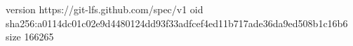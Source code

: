 version https://git-lfs.github.com/spec/v1
oid sha256:a0114dc01c02e9d4480124dd93f33adfcef4ed11b717ade36da9ed508b1c16b6
size 166265

